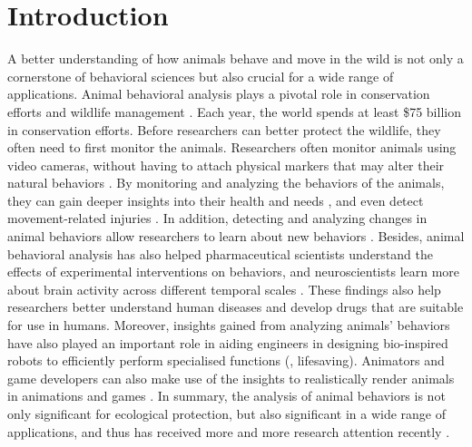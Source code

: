 \documentclass[10pt,twocolumn,letterpaper]{article}
\begin{document}
    
    \vspace{-0.5cm}
    
    \section{Introduction}
    
    
    A better understanding of how animals behave and move in the wild is not only a cornerstone of behavioral sciences \cite{graving2019deepposekit} but also crucial for a wide range of applications. Animal behavioral analysis plays a pivotal role in conservation efforts \cite{singh2020animal, ani11020485} and wildlife management \cite{nguyen2017animal}. Each year, the world spends at least \$75 billion \cite{mccarthy2012financial, biod2020global} in conservation efforts. Before researchers can better protect the wildlife, they often need to first monitor the animals. Researchers often monitor animals using video cameras, without having to attach physical markers that may alter their natural behaviors \cite{graving2019deepposekit}. By monitoring and analyzing the behaviors of the animals, they can gain deeper insights into their health and needs \cite{graving2019deepposekit}, and even detect movement-related injuries \cite{graving2019deepposekit}. In addition, detecting and analyzing changes in animal behaviors allow researchers to learn about new behaviors \cite{von2021big, ANDERSON201418}. Besides, animal behavioral analysis has also helped pharmaceutical scientists understand the effects of experimental interventions on behaviors, and neuroscientists learn more about brain activity across different temporal scales \cite{graving2019deepposekit, pereira2019fast, MATHIS20201, ANDERSON201418, karashchuk2021anipose}. These findings also help researchers better understand human diseases and develop drugs that are suitable for use in humans. Moreover, insights gained from analyzing animals' behaviors have also played an important role in aiding engineers in designing bio-inspired robots \cite{mu2020learning, zuffi2018lions} to efficiently perform specialised functions (\eg, lifesaving). Animators and game developers can also make use of the insights to realistically render animals in animations and games \cite{cao2019cross, zuffi2018lions}. In summary, the analysis of animal behaviors is not only significant for ecological protection, but also significant in a wide range of applications, and thus has received more and more research attention recently \cite{liwildlife, ani11020485, rahman2014fast, maaloy2019spatio, liu2020computer, yang2018feeding, yu2021apk, cao2019cross, mu2020learning, li2020deformation}.
    
\end{document}
